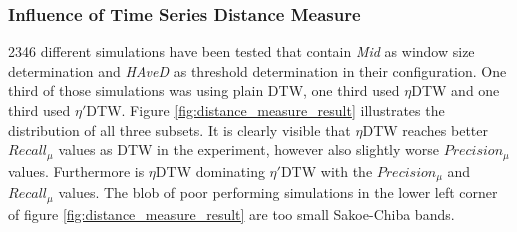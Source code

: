 \subsubsection{Influence of Time Series Distance Measure} \label{influence_of_time_series_distance_measure}
2346 different simulations have been tested that contain \textit{Mid} as window size determination and
\textit{HAveD} as threshold determination in their configuration. One third of those simulations was
using plain DTW, one third used $\eta$DTW and one third used $\eta '$DTW. Figure \ref{fig:distance_measure_result}
illustrates the distribution of all three subsets. It is clearly visible that $\eta$DTW reaches better $Recall_{\mu}$
values as DTW in the experiment, however also slightly worse $Precision_{\mu}$ values. Furthermore is $\eta$DTW
dominating $\eta '$DTW with the $Precision_{\mu}$ and $Recall_{\mu}$ values. The blob of poor performing simulations in
the lower left corner of figure \ref{fig:distance_measure_result} are too small Sakoe-Chiba bands.


